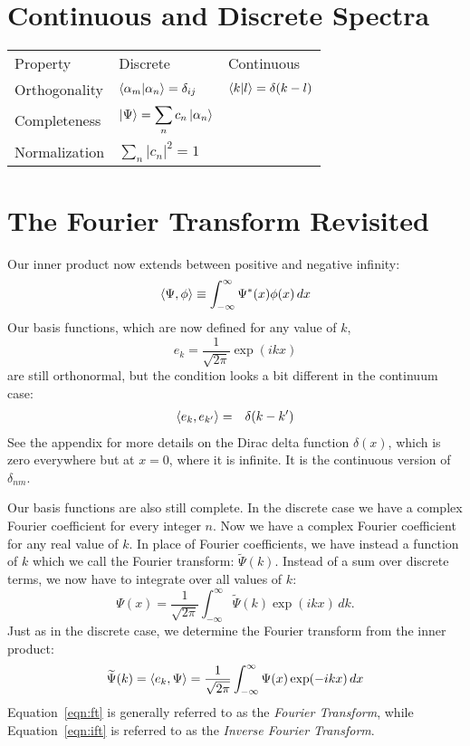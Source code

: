 \documentclass[12pt]{book}
\begin{document}
\section{Continuous and Discrete Spectra}

\begin{tabular}{lll}
Property      & Discrete & Continuous \\[8pt]
Orthogonality & $\braket{\alpha_m|\alpha_n} = \delta_{ij}$ & $\braket{k|l} = \delta(k-l)$ \\[8pt]
Completeness  & $\displaystyle \ket{\Psi} = \sum_n c_n \ket{\alpha_n}$ & \\[8pt]
Normalization & $\displaystyle \sum_n |c_n|^2 = 1$ & \\[8pt]
\end{tabular}




\section{The Fourier Transform Revisited}

Our inner product now extends between positive and negative infinity:
\begin{equation}
\braket{\Psi, \phi} \equiv \int_{-\infty}^{\infty} \Psi^*(x) \phi(x) \, dx
\end{equation}
Our basis functions, which are now defined for any value of $k$,
\begin{equation}
e_k = \frac{1}{\sqrt{2\pi}} \exp(i k x)
\end{equation}
are still orthonormal, but the condition looks a bit different in the continuum case:
\begin{eqnarray*}
\braket{e_k, e_{k'}} &=& \delta(k-k')
\end{eqnarray*}
See the appendix for more details on the Dirac delta function $\delta(x)$, which is zero everywhere but at $x=0$, where it is infinite.  It is the continuous version of $\delta_{nm}$.

Our basis functions are also still complete.  In the discrete case we have a complex Fourier coefficient for every integer $n$.   Now we have a complex Fourier coefficient for any real value of $k$.  In place of Fourier coefficients, we have instead a function of $k$ which we call the Fourier transform: $\widetilde{\Psi}(k)$.
Instead of a sum over discrete terms, we now have to integrate over all values of $k$:
\begin{equation} \label{eqn:ift}
\Psi(x) = \frac{1}{\sqrt{2\pi}} \int_{-\infty}^{\infty} \widetilde{\Psi}(k) \exp(ikx) \, dk.
\end{equation}
Just as in the discrete case, we determine the Fourier transform from the inner product:
\begin{equation} \label{eqn:ft}
\widetilde{\Psi}(k) = \braket{e_k, \Psi} = \frac{1}{\sqrt{2\pi}} \int_{-\infty}^{\infty} {\Psi}(x) \exp(-ikx) \, dx
\end{equation}
Equation~\ref{eqn:ft} is generally referred to as the {\em Fourier Transform}, while Equation~\ref{eqn:ift} is referred to as the {\em Inverse Fourier Transform}.
\end{document}
